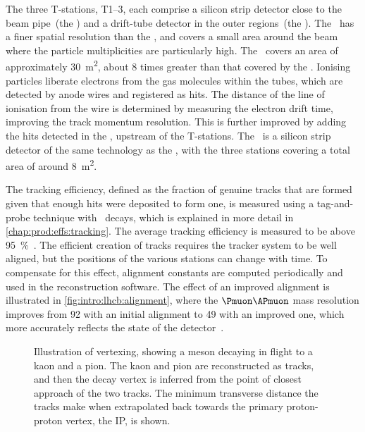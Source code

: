The three T-stations, T1--3, each comprise a silicon strip detector close to 
the beam pipe~(the \itracker) and a drift-tube detector in the outer 
regions~(the \otracker).
The \itracker\ has a finer spatial resolution than the \otracker, and covers a 
small area around the beam where the particle multiplicities are particularly 
high.
The \otracker\ covers an area of approximately \SI{30}{\metre\squared}, about 8 
times greater than that covered by the \itracker.
Ionising particles liberate electrons from the gas molecules within the tubes, 
which are detected by anode wires and registered as hits.
The distance of the line of ionisation from the wire is determined by measuring 
the electron drift time, improving the track momentum resolution.
This is further improved by adding the hits detected in the \ttracker, upstream 
of the T-stations.
The \ttracker\ is a silicon strip detector of the same technology as the 
\itracker, with the three stations covering a total area of around 
\SI{8}{\metre\squared}.

The tracking efficiency, defined as the fraction of genuine tracks that are 
formed given that enough hits were deposited to form one, is measured using a 
tag-and-probe technique with \JpsiTomumu\ decays, which is explained in more 
detail in \cref{chap:prod:effs:tracking}.
The average tracking efficiency is measured to be above 
\SI{95}{\percent}~\cite{Aaij:2014pwa}.
The efficient creation of tracks requires the tracker system to be well 
aligned, but the positions of the various stations can change with time.
To compensate for this effect, alignment constants are computed periodically 
and used in the reconstruction software.
The effect of an improved alignment is illustrated in 
\cref{fig:intro:lhcb:alignment}, where the $\Pmuon\APmuon$ mass resolution 
improves from \SI{92}{\MeVcc} with an initial alignment to \SI{49}{\MeVcc} with 
an improved one, which more accurately reflects the state of the 
detector~\cite{Dujany:082010}.

\begin{figure}
  \centering
  
  \caption{%
    Illustration of vertexing, showing a \PDz meson decaying in flight to a 
    kaon and a pion.
    The kaon and pion are reconstructed as tracks, and then the \PDzero decay 
    vertex is inferred from the point of closest approach of the two tracks.
    The minimum transverse distance the tracks make when extrapolated back 
    towards the primary proton-proton vertex, the \acf{IP}, is shown.
  }
  \label{fig:intro:lhcb:vertexing}
\end{figure}

